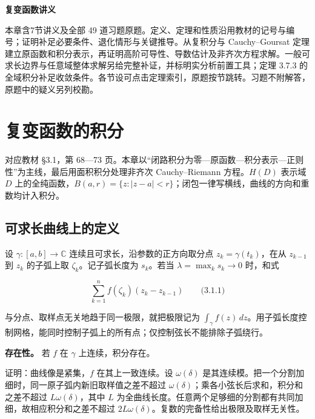 \documentclass[11pt,a4paper]{article}
\begin{document}
\begin{center}
{\LARGE\bfseries 复变函数讲义\par}
\vspace{8pt}{\large 第三章\quad 全纯函数的积分表示\par}
\vspace{6pt}{\small 依史济怀、刘太顺《复变函数》\quad 教材第 68—102 页\par}
\end{center}\vspace{8pt}
本章含7节讲义及全部 49 道习题原题。定义、定理和性质沿用教材的记号与编号；证明补足必要条件、退化情形与关键推导。从复积分与 Cauchy--Goursat 定理建立原函数和积分表示，再证明高阶可导性、导数估计及非齐次方程求解。一般可求长边界与任意域整体求解另给完整补证，并标明实分析前置工具；定理 3.7.3 的全域积分补足收敛条件。各节设可点击定理索引，原题按节跳转。习题不附解答，原题中的疑义另列校勘。
\tableofcontents\clearpage
\section{复变函数的积分}
对应教材 §3.1，第 68---73
页。本章以``闭路积分为零---原函数---积分表示---正则性''为主线，最后用面积积分处理非齐次
Cauchy--Riemann 方程。\(H(D)\) 表示域 \(D\)
上的全纯函数，\(B(a,r)=\{z:|z-a|<r\}\)；闭包一律写横线，曲线的方向和重数均计入积分。

\subsection{可求长曲线上的定义}\label{ch03-s1-ux53efux6c42ux957fux66f2ux7ebfux4e0aux7684ux5b9aux4e49}

设 \(\gamma:[a,b]\to\mathbb C\) 连续且可求长，沿参数的正方向取分点
\(z_k=\gamma(t_k)\)，在从 \(z_{k-1}\) 到 \(z_k\) 的子弧上取
\(\zeta_k\)。记子弧长度为 \(s_k\)。若当 \(\lambda=\max_k s_k\to0\)
时，和式

\[
\sum_{k=1}^{n}f(\zeta_k)(z_k-z_{k-1})
\qquad\text{(3.1.1)}
\]

与分点、取样点无关地趋于同一极限，就把极限记为
\(\int_\gamma f(z)\,dz\)。用子弧长度控制网格，能同时控制子弧上的所有点；仅控制弦长不能排除子弧绕行。

\textbf{存在性。} 若 \(f\) 在 \(\gamma\) 上连续，积分存在。

证明：曲线像是紧集，\(f\) 在其上一致连续。设 \(\omega(\delta)\)
是其连续模。把一个分割加细时，同一原子弧内新旧取样值之差不超过
\(\omega(\delta)\)；乘各小弦长后求和，积分和之差不超过
\(L\omega(\delta)\)，其中 \(L\)
为全曲线长度。任意两个足够细的分割都有共同加细，故相应积分和之差不超过
\(2L\omega(\delta)\)。复数的完备性给出极限及取样无关性。
\end{document}
